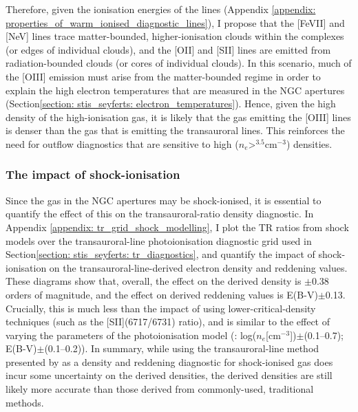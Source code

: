 Therefore, given the ionisation energies of the lines (Appendix \ref{appendix: properties_of_warm_ionised_diagnostic_lines}), I propose that the [FeVII] and [NeV] lines trace matter-bounded, higher-ionisation clouds within the complexes (or edges of individual clouds), and the [OII] and [SII] lines are emitted from radiation-bounded clouds (or cores of individual clouds). In this scenario, much of the [OIII] emission must arise from the matter-bounded regime in order to explain the high electron temperatures that are measured in the NGC apertures (Section\;\ref{section: stis_seyferts: electron_temperatures}). Hence, given the high density of the high-ionisation gas, it is likely that the gas emitting the [OIII] lines is denser than the gas that is emitting the transauroral lines. This reinforces the need for outflow diagnostics that are sensitive to high ($n_e$\;\textgreater{}$^{3.5}$\;cm$^{-3}$) densities.

\subsubsection{The impact of shock-ionisation}

Since the gas in the NGC apertures may be shock-ionised, it is essential to quantify the effect of this on the transauroral-ratio density diagnostic. In Appendix \ref{appendix: tr_grid_shock_modelling}, I plot the TR ratios from shock models over the transauroral-line photoionisation diagnostic grid used in Section\;\ref{section: stis_seyferts: tr_diagnostics}, and quantify the impact of shock-ionisation on the transauroral-line-derived electron density and reddening values. These diagrams show that, overall, the effect on the derived density is $\pm$0.38 orders of magnitude, and the effect on derived reddening values is E(B-V)$\pm$0.13. Crucially, this is much less than the impact of using lower-critical-density techniques (such as the [SII](6717/6731) ratio), and is similar to the effect of varying the parameters of the photoionisation model (\citealt{Santoro2020}: log($n_e$[cm$^{-3}$])$\pm$(0.1--0.7); E(B-V)$\pm$(0.1--0.2)). In summary, while using the transauroral-line method presented by \citet{Holt2011} as a density and reddening diagnostic for shock-ionised gas does incur some uncertainty on the derived densities, the derived densities are still likely more accurate than those derived from commonly-used, traditional methods.

